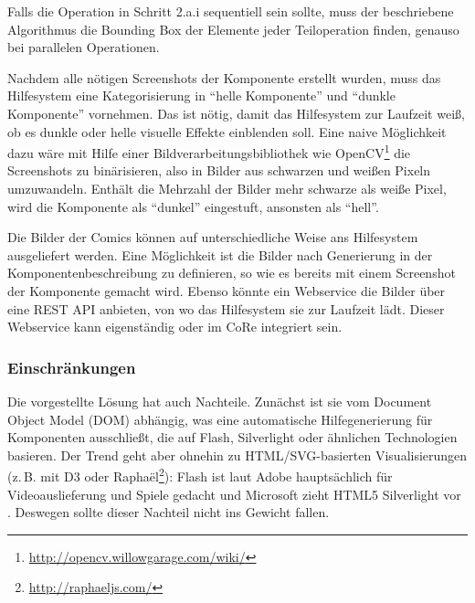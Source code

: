 \documentclass[
	headsepline,
	footsepline,
	fontsize=12pt,
	bibliography=totoc
]{scrbook}
\begin{document}
Falls die Operation in Schritt 2.a.i sequentiell sein sollte, muss der beschriebene Algorithmus die Bounding Box der Elemente jeder Teiloperation finden, genauso bei parallelen Operationen.


Nachdem alle nötigen Screenshots der Komponente erstellt wurden, muss das Hilfesystem eine Kategorisierung in \enquote{helle Komponente} und \enquote{dunkle Komponente} vornehmen. Das ist nötig, damit das Hilfesystem zur Laufzeit weiß, ob es dunkle oder helle visuelle Effekte einblenden soll. Eine naive Möglichkeit dazu wäre mit Hilfe einer Bildverarbeitungsbibliothek wie OpenCV\footnote{\url{http://opencv.willowgarage.com/wiki/}} die Screenshots zu binärisieren, also in Bilder aus schwarzen und weißen Pixeln umzuwandeln. Enthält die Mehrzahl der Bilder mehr schwarze als weiße Pixel, wird die Komponente als \enquote{dunkel} eingestuft, ansonsten als \enquote{hell}.


Die Bilder der Comics können auf unterschiedliche Weise ans Hilfesystem ausgeliefert werden. Eine Möglichkeit ist die Bilder nach Generierung in der Komponentenbeschreibung zu definieren, so wie es bereits mit einem Screenshot der Komponente gemacht wird. Ebenso könnte ein Webservice die Bilder über eine REST API anbieten, von wo das Hilfesystem sie zur Laufzeit lädt. Dieser Webservice kann eigenständig oder im CoRe integriert sein.

\subsubsection{Einschränkungen}
\label{section:konzeption:bedienung:generierung:einschraenkungen}


Die vorgestellte Lösung hat auch Nachteile. Zunächst ist sie vom Document Object Model (DOM) abhängig, was eine automatische Hilfegenerierung für Komponenten ausschließt, die auf Flash, Silverlight oder ähnlichen Technologien basieren. Der Trend geht aber ohnehin zu HTML/SVG-basierten Visualisierungen (z.\,B. mit D3 \cite{Bostock2011} oder Raphaël\footnote{\url{http://raphaeljs.com/}}): Flash ist laut Adobe hauptsächlich für Videoauslieferung und Spiele gedacht \cite{Adobe2013} und Microsoft zieht HTML5 Silverlight vor \cite{Foley2010}. Deswegen sollte dieser Nachteil nicht ins Gewicht fallen.
\end{document}
